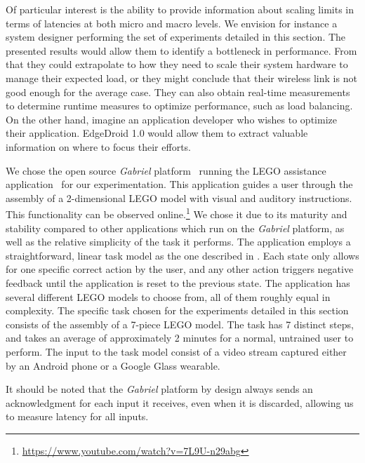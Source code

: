 Of particular interest is the ability to provide information about scaling limits in terms of latencies at both micro and macro levels.
We envision for instance a system designer performing the set of experiments detailed in this section.
The presented results would allow them to identify a bottleneck in performance.
From that they could extrapolate to how they need to scale their system hardware to manage their expected load, or they might conclude that their wireless link is not good enough for the average case.
They can also obtain real-time measurements to determine runtime measures to optimize performance, such as load balancing.
On the other hand, imagine an application developer who wishes to optimize their application.
EdgeDroid 1.0 would allow them to extract valuable information on where to focus their efforts.


We chose the open source \emph{Gabriel} platform~\cite{Ha:TowardsWearableCogAssist} running the LEGO assistance application~\cite{Chen:AnEmpiricalStudyOfLatency} for our experimentation.
This application guides a user through the assembly of a 2-dimensional LEGO model with visual and auditory instructions.
This functionality can be observed online.\footnote{\url{https://www.youtube.com/watch?v=7L9U-n29abg}}
We chose it due to its maturity and stability compared to other applications which run on the \emph{Gabriel} platform, as well as the relative simplicity of the task it performs.
The application employs a straightforward, linear task model as the one described in .
Each state only allows for one specific correct action by the user, and any other action triggers negative feedback until the application is reset to the previous state.
The application has several different LEGO models to choose from, all of them roughly equal in complexity.
The specific task chosen for the experiments detailed in this section consists of the assembly of a 7-piece LEGO model.
The task has 7 distinct steps, and takes an average of approximately 2 minutes for a normal, untrained user to perform.
The input to the task model consist of a video stream captured either by an Android phone or a Google Glass wearable.

It should be noted that the \emph{Gabriel} platform by design always sends an acknowledgment for each input it receives, even when it is discarded, allowing us to measure latency for all inputs.


